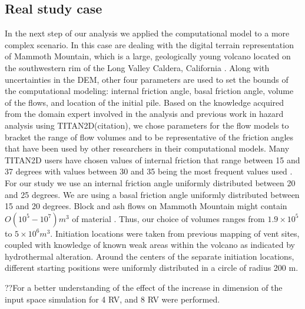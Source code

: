 \documentclass{article}
\begin{document}
\subsection{Real study case}
In the next step of our analysis we applied the computational model to
a more complex scenario. In this case are dealing with the digital terrain
representation of Mammoth Mountain, which is a large, geologically 
young volcano located on the southwestern rim of the Long Valley 
Caldera, California \citep{Bailey1989 and StefanescuM}. 
Along with uncertainties in the DEM, other four 
parameters are used to set the bounds of the computational modeling:
internal friction angle, basal friction angle, volume of the flows, and location 
of the initial pile. 
Based on the knowledge acquired from the domain expert  involved in the 
analysis and previous work in hazard analysis using TITAN2D(citation), we 
chose parameters for the flow models to bracket the range of flow volumes 
and to be representative of the friction angles that have been used by other
researchers in their computational models.  
Many TITAN2D users have chosen values of internal friction that range between
15 and 37 degrees with
values between 30 and 35 being the most frequent values used
\citep{Patra2005, murcia_2010}.  For our study we use an internal
friction angle uniformly distributed between 20 and 25 degrees.
We are using a basal friction angle
uniformly distributed between 15 and 20 degrees.
Block and ash flows on Mammoth Mountain might contain $O(10^5 -
10^7) m^3$ of material \citep{Patra2005, Burkett2007}.  Thus, our
choice of volumes ranges from $1.9 \times 10^5$ to $5 \times 10^6
m^3$.  
Initiation locations were taken from previous mapping of vent sites,
coupled with knowledge of known weak areas within the volcano as
indicated by hydrothermal alteration.  Around the centers of the
separate initiation locations, different starting positions were
uniformly distributed in a circle of radius 200 m.  

??For a better understanding of the effect of the increase in dimension
of the input space simulation for 4 RV,  and 8 RV were performed.
\end{document}
